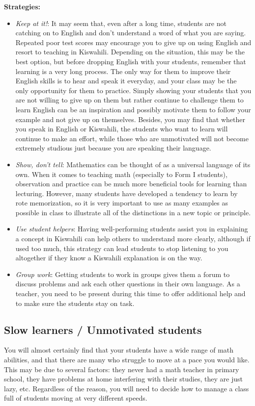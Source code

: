 \textbf{Strategies:}
\begin{itemize}
\item\emph{Keep at it!}: It may seem that, even after a long time, students are not catching on to English and don't understand a word of what you are saying. Repeated poor test scores may encourage you to give up on using English and resort to teaching in Kiswahili. Depending on the situation, this may be the best option, but before dropping English with your students, remember that learning is a very long process. The only way for them to improve their English skills is to hear and speak it everyday, and your class may be the only opportunity for them to practice. Simply showing your students that you are not willing to give up on them but rather continue to challenge them to learn English can be an inspiration and possibly motivate them to follow your example and not give up on themselves. Besides, you may find that whether you speak in English or Kiswahili, the students who want to learn will continue to make an effort, while those who are unmotivated will not become extremely studious just because you are speaking their language.

\item\emph{Show, don't tell}: Mathematics can be thought of as a universal language of its own. When it comes to teaching math (especially to Form I students), observation and practice can be much more beneficial tools for learning than lecturing. However, many students have developed a tendency to learn by rote memorization, so it is very important to use as many examples as possible in class to illustrate all of the distinctions in a new topic or principle.

\item\emph{Use student helpers}: Having well-performing students assist you in explaining a concept in Kiswahili can help others to understand more clearly, although if used too much, this strategy can lead students to stop listening to you altogether if they know a Kiswahili explanation is on the way.

\item\emph{Group work}: Getting students to work in groups gives them a forum to discuss problems and ask each other questions in their own language. As a teacher, you need to be present during this time to offer additional help and to make sure the students stay on task.
\end{itemize}

\subsection{Slow learners / Unmotivated students}
You will almost certainly find that your students have a wide range of math abilities, and that there are many who struggle to move at a pace you would like. This may be due to several factors: they never had a math teacher in primary school, they have problems at home interfering with their studies, they are just lazy, etc. Regardless of the reason, you will need to decide how to manage a class full of students moving at very different speeds.\\

